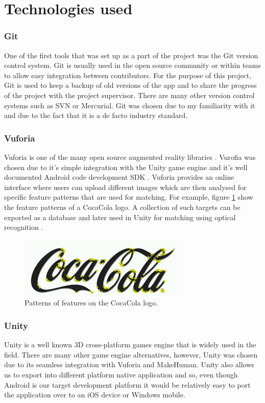 \documentclass{l4proj}
\begin{document}
\section{Technologies used}
\subsubsection{Git}
One of the first tools that was set up as a part of the project was the Git version control system. Git is usually used in the open source community or within teams to allow easy integration between contributors. For the purpose of this project, Git is used to keep a backup of old versions of the app and to share the progress of the project with the project supervisor. There are many other version control systems such as SVN or Mercurial. Git was chosen due to my familiarity with it and due to the fact that it is a de facto industry standard.
    
\subsubsection{Vuforia}
Vuforia is one of the many open source augmented reality libraries \cite{vuforia_getting_2016}. Vurofia was chosen due to it's simple integration with the Unity game engine and it's well documented Android code development SDK \cite{rao_how_2015}. Vuforia provides an online interface where users can upload different images which are then analysed for specific feature patterns that are used for matching. For example, figure \ref{fig:coca_cola_features} show the feature patterns of a CocaCola logo. A collection of such targets can be exported as a database and later used in Unity for matching using optical recognition \cite{rao_how_2015}.
\begin{figure}
\centering
\includegraphics[scale=1]{images/coca_cola_features.png}
\caption{Patterns of features on the CocaCola logo.}
\label{fig:coca_cola_features}
\end{figure}

\subsubsection{Unity}
Unity is a well known 3D cross-platform games engine that is widely used in the field. There are many other game engine alternatives, however, Unity was chosen due to its seamless integration with Vuforia and MakeHuman. Unity also allows us to export into different platform native application and so, even though Android is our target development platform it would be relatively easy to port the application over to an iOS device or Windows mobile. 
\end{document}
